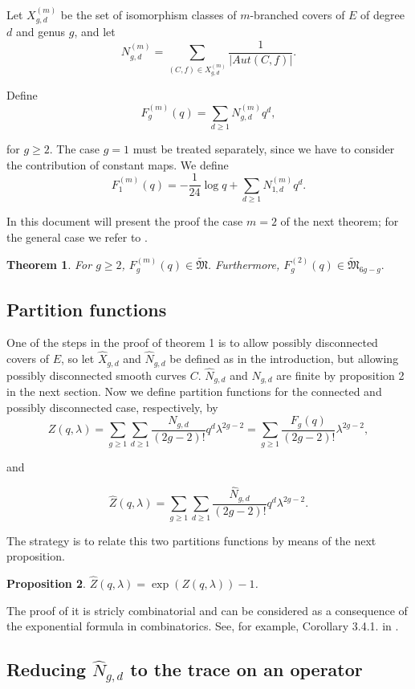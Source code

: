 \documentclass{article}
\numberwithin{equation}{section}
\numberwithin{figure}{section}
\theoremstyle{plain}
\newtheorem{theorem}{Theorem}[section]
\newtheorem{proposition}[theorem]{Proposition}
\theoremstyle{definition}
\numberwithin{equation}{section}
\newtheorem[S, bodystyle=\normalfont\noindent]{defiS}{Definition}[section]
\begin{document}
Let $X_{g,d}^{(m)}$ be the set of isomorphism classes of $m$-branched covers of $E$ of degree $d$ and genus $g$, and let $$N_{g,d}^{(m)}=\sum_{(C,f)\in X_{g,d}^{(m)}} \frac{1}{|Aut{(C,f)}|}.$$

Define $$F_g^{(m)}(q)=\sum_{d\geq 1}N_{g,d}^{(m)}q^d,$$

for $g\geq 2$. The case $g=1$ must be treated separately, since we have to consider the contribution of constant maps. We define $$F_1^{(m)}(q)=-\frac{1}{24} \log q+\sum_{d\geq 1}N_{1,d}^{(m)}q^d.$$

In this document will present the proof the case $m=2$ of the next theorem; for the general case
we refer to \cite{Och}.

\begin{theorem}\parencite{dijkgraaf,ochiai} For $g\geq 2$, $F_g^{(m)}(q)\in \mathfrak{\tilde{M}}$. Furthermore, $F_g^{(2)}(q)\in \mathfrak{\tilde{M}}_{6g-g}.$
\end{theorem}


\subsection{Partition functions}

One of the steps in the proof of theorem 1 is to allow possibly disconnected covers of $E$, so let $\hat{X}_{g,d}$ and $\hat{N}_{g,d}$ be defined as in the introduction, but allowing possibly disconnected smooth curves $C$. $\hat{N}_{g,d}$ and $N_{g,d}$ are finite by proposition 2 in the next section. Now we define partition functions for the connected and possibly disconnected case, respectively, by $$Z(q,\lambda)=\sum_{g\geq 1}\sum_{d\geq 1}\frac{N_{g,d}}{(2g-2)!}q^d\lambda^{2g-2}=\sum_{g\geq 1}\frac{F_g(q)}{(2g-2)!}\lambda^{2g-2},$$

and 

$$\hat{Z}(q,\lambda)=\sum_{g\geq 1}\sum_{d\geq 1}\frac{\hat{N}_{g,d}}{(2g-2)!}q^d\lambda^{2g-2}.$$

The strategy is to relate this two partitions functions by means of the next proposition.

\begin{proposition}
$\hat{Z}(q,\lambda)=\exp(Z(q,\lambda))-1$.
\end{proposition}

The proof of it is stricly combinatorial and can be considered as a consequence of the exponential formula in combinatorics. See, for example, Corollary 3.4.1. in \cite{wilf}.

\subsection{Reducing $\hat{N}_{g,d}$ to the trace on an operator}
\end{document}
